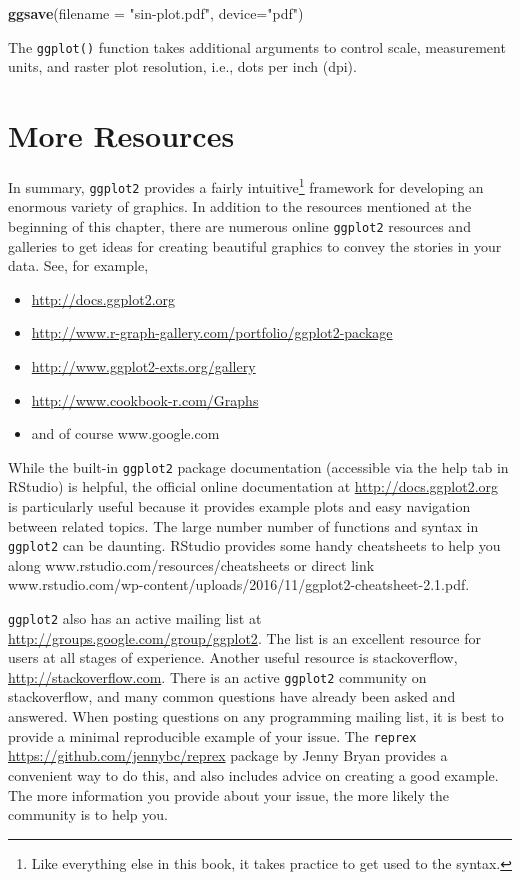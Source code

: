 \documentclass[]{krantz}
\makeatletter
\newenvironment{Shaded}{\begin{snugshade}}{\end{snugshade}}
\newcommand{\KeywordTok}[1]{\textcolor[rgb]{0.27,0.27,0.27}{\textbf{#1}}}
\newcommand{\DataTypeTok}[1]{\textcolor[rgb]{0.27,0.27,0.27}{#1}}
\newcommand{\StringTok}[1]{\textcolor[rgb]{0.5,0.5,0.5}{#1}}
\newcommand{\NormalTok}[1]{#1}
\providecommand{\tightlist}{%
  \setlength{\itemsep}{0pt}\setlength{\parskip}{0pt}}
\newenvironment{kframe}{%
\medskip{}
\setlength{\fboxsep}{.8em}
 \def\at@end@of@kframe{}%
 \ifinner\ifhmode%
  \def\at@end@of@kframe{\end{minipage}}%
  \begin{minipage}{\columnwidth}%
 \fi\fi%
 \def\FrameCommand##1{\hskip\@totalleftmargin \hskip-\fboxsep
 \colorbox{shadecolor}{##1}\hskip-\fboxsep
     \hskip-\linewidth \hskip-\@totalleftmargin \hskip\columnwidth}%
 \MakeFramed {\advance\hsize-\width
   \@totalleftmargin\z@ \linewidth\hsize
   \@setminipage}}%
 {\par\unskip\endMakeFramed%
 \at@end@of@kframe}
\renewenvironment{Shaded}{\begin{kframe}}{\end{kframe}}
\makeatother
\begin{document}
\begin{Shaded}
\begin{Highlighting}[]
\KeywordTok{ggsave}\NormalTok{(}\DataTypeTok{filename =} \StringTok{"sin-plot.pdf"}\NormalTok{, }\DataTypeTok{device=}\StringTok{"pdf"}\NormalTok{)}
\end{Highlighting}
\end{Shaded}

The \texttt{ggplot()} function takes additional arguments to control
scale, measurement units, and raster plot resolution, i.e., dots per
inch (dpi).

\section{More Resources}\label{more-resources}

In summary, \texttt{ggplot2} provides a fairly intuitive\footnote{Like
  everything else in this book, it takes practice to get used to the
  syntax.} framework for developing an enormous variety of graphics. In
addition to the resources mentioned at the beginning of this chapter,
there are numerous online \texttt{ggplot2} resources and galleries to
get ideas for creating beautiful graphics to convey the stories in your
data. See, for example,

\begin{itemize}
\tightlist
\item
  \url{http://docs.ggplot2.org}
\item
  \url{http://www.r-graph-gallery.com/portfolio/ggplot2-package}
\item
  \url{http://www.ggplot2-exts.org/gallery}
\item
  \url{http://www.cookbook-r.com/Graphs}
\item
  and of course www.google.com
\end{itemize}

While the built-in \texttt{ggplot2} package documentation (accessible
via the help tab in RStudio) is helpful, the official online
documentation at \url{http://docs.ggplot2.org} is particularly useful
because it provides example plots and easy navigation between related
topics. The large number number of functions and syntax in
\texttt{ggplot2} can be daunting. RStudio provides some handy
cheatsheets to help you along www.rstudio.com/resources/cheatsheets or
direct link
www.rstudio.com/wp-content/uploads/2016/11/ggplot2-cheatsheet-2.1.pdf.

\texttt{ggplot2} also has an active mailing list at
\url{http://groups.google.com/group/ggplot2}. The list is an excellent
resource for users at all stages of experience. Another useful resource
is stackoverflow, \url{http://stackoverflow.com}. There is an active
\texttt{ggplot2} community on stackoverflow, and many common questions
have already been asked and answered. When posting questions on any
programming mailing list, it is best to provide a minimal reproducible
example of your issue. The \texttt{reprex}
\url{https://github.com/jennybc/reprex} package by Jenny Bryan provides
a convenient way to do this, and also includes advice on creating a good
example. The more information you provide about your issue, the more
likely the community is to help you.
\end{document}
